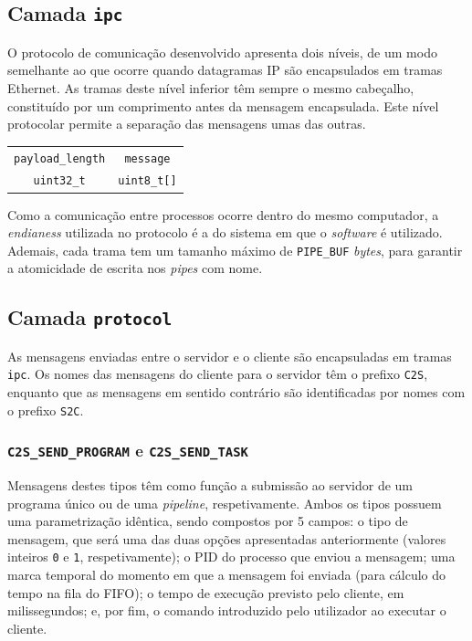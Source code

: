 \documentclass[11pt]{article}
\begin{document}
\subsection{Camada \texttt{ipc}}

O protocolo de comunicação desenvolvido apresenta dois níveis, de um modo semelhante ao que ocorre
quando datagramas IP são encapsulados em tramas Ethernet. As tramas deste nível inferior têm sempre
o mesmo cabeçalho, constituído por um comprimento antes da mensagem encapsulada. Este nível
protocolar permite a separação das mensagens umas das outras.

\begin{center}
    \begin{tabular}{|c|c|}
        \hline
        \texttt{payload\_length} & \texttt{message}    \\
        \texttt{uint32\_t}       & \texttt{uint8\_t[]} \\
        \hline
    \end{tabular}
\end{center}

Como a comunicação entre processos ocorre dentro do mesmo computador, a \emph{endianess} utilizada
no protocolo é a do sistema em que o \emph{software} é utilizado. Ademais, cada trama tem um tamanho
máximo de \texttt{PIPE\_BUF} \emph{bytes}, para garantir a atomicidade de escrita nos \emph{pipes}
com nome.

\subsection{Camada \texttt{protocol}}

As mensagens enviadas entre o servidor e o cliente são encapsuladas em tramas \texttt{ipc}.
Os nomes das mensagens do cliente para o servidor têm o prefixo \texttt{C2S}, enquanto que as
mensagens em sentido contrário são identificadas por nomes com o prefixo \texttt{S2C}.

\subsubsection{\texttt{C2S\_SEND\_PROGRAM} e \texttt{C2S\_SEND\_TASK}}

Mensagens destes tipos têm como função a submissão ao servidor de um programa único ou de uma
\emph{pipeline}, respetivamente. Ambos os tipos possuem uma parametrização idêntica, sendo compostos
por 5 campos: o tipo de mensagem, que será uma das duas opções apresentadas anteriormente (valores
inteiros \texttt{0} e \texttt{1}, respetivamente); o PID do processo que enviou a mensagem; uma
marca temporal do momento em que a mensagem foi enviada (para cálculo do tempo na fila do FIFO); o
tempo de execução previsto pelo cliente, em milissegundos; e, por fim, o comando introduzido pelo
utilizador ao executar o cliente.
\end{document}

